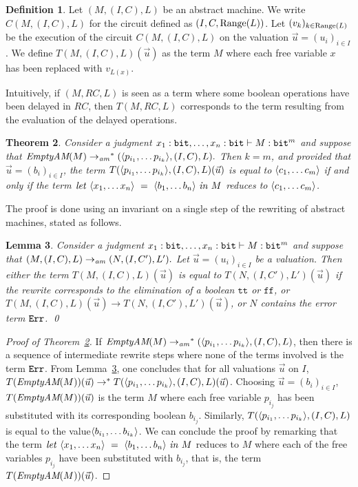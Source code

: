 \documentclass{article}
\theoremstyle{plain}
\newtheorem{theorem}{Theorem}
\newtheorem{lemma}[theorem]{Lemma}
\theoremstyle{definition}
\newtheorem{definition}[theorem]{Definition}
\newcommand{\bit}{{\tt bit}}
\newcommand{\letprodterm}[3]{{{\it let}~\prodterm{#1}~=~{#2}~{\it in}~{#3}}}
\newcommand{\ttrue}{\mathtt{t\!t}}
\newcommand{\ffalse}{\mathtt{f\!f}}
\newcommand{\errorlist}{{\tt Err}}
\newcommand{\emptyam}{\textrm{{\it EmptyAM}}}
\newcommand{\rwam}{\mathrel{\to_{\it am}}}
\begin{document}
\begin{definition}
  Let $(M,(I,C),L)$ be an abstract machine. 
We write $C(M,(I,C),L)$ for the circuit defined as $(I,
  C, {\rm Range}(L))$.
Let $(v_k)_{k\in {\rm Range}(L)}$ be the execution of the circuit
  $C(M,(I,C),L)$ on the valuation $\vec{u} = (u_i)_{i\in I}$. We
  define $T(M,(I,C),L)(\vec{u})$ as the term $M$ where each free
  variable $x$ has been replaced with $v_{L(x)}$.
\end{definition}

Intuitively, if $(M,RC,L)$ is seen as a term where some boolean
operations have been delayed in $RC$, then $T(M,RC,L)$ corresponds to the
term resulting from the evaluation of the delayed operations.

\begin{theorem}\label{th:sim}
  \label{th:eq-am-beta}
  Consider a judgment $x_1:\bit,\ldots,x_n:\bit\vdash M:\bit^m$ and
  suppose that
  $
    \emptyam(M)\rwam^*(\prodterm{p_{i_1},\ldots p_{i_k}}, (I,C),
  L).
  $
  Then $k=m$, and provided that $\vec{u} = (b_i)_{i\in I}$, the term
  $T({\langle{p_{i_1},\ldots p_{i_k}}\rangle}, (I,C), L)(\vec{u})$ is
  equal to ${\langle{c_1,\ldots c_m}\rangle}$ if and only if the
  term $ \letprodterm{x_1,\ldots x_n}{\prodterm{b_1,\ldots b_n}}{M} $
  reduces to ${\langle{c_1,\ldots c_m}\rangle}$.
\end{theorem}

The proof is done using an invariant on a single step of the rewriting
of abstract machines, stated as follows.


\begin{lemma}\label{lem:inv1}
  Consider a judgment $x_1:\bit,\ldots,x_n:\bit\vdash M:\bit^m$ and
  suppose that
  $
    (M,(I,C),L)\rwam(N,(I,C'),L').
  $
  Let $\vec{u}=(u_i)_{i\in I}$ be a valuation.
Then either the term
  $T(M,(I,C),L)(\vec{u})$ is equal to $T(N,(I,C'),L')(\vec{u})$ if the rewrite corresponds to the
  elimination of a boolean $\ttrue$ or $\ffalse$, or $
  T(M,(I,C),L)(\vec{u}) \to T(N,(I,C'),L')(\vec{u})$, or $N$ contains the
  error term 
  $\errorlist$.
  \qed
\end{lemma}

\begin{proof}[Proof of Theorem~\ref{th:sim}]
  If
  $\emptyam(M)\rwam^*(\prodterm{p_{i_1},\ldots p_{i_k}}, (I,C), L)$,
  then there is a sequence of intermediate rewrite steps where none of
  the terms involved is the term $\errorlist$. From Lemma~\ref{lem:inv1}, one
  concludes that for all valuations $\vec{u}$ on $I$,
  $T(\emptyam(M))(\vec{u}) \to^* T(\prodterm{p_{i_1},\ldots p_{i_k}}, (I,C),
  L)(\vec{u})$.
Choosing $\vec{u} = (b_i)_{i\in I}$, 
  $T(\emptyam(M))(\vec{u})$ is the term $M$ where each free
  variable $p_{i_j}$ has been substituted with its corresponding
  boolean $b_{i_j}$. 
Similarly,
  $T({\langle{p_{i_1},\ldots p_{i_k}}\rangle}, (I,C), L)$ is equal to the value$
  {\langle{b_{i_1},\ldots b_{i_k}}\rangle}$. We can conclude the proof by
  remarking that the term  $\letprodterm{x_1,\ldots
    x_n}{\prodterm{b_1,\ldots b_n}}{M} $ reduces to  $M$ where each of the free
  variables $p_{i_j}$ have been substituted with $b_{i_j}$, that is, 
  the term $T(\emptyam(M))(\vec{u})$.
\end{proof}
\end{document}

